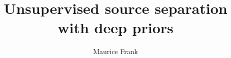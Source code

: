 \documentclass[nofonts, nobib, notitlepage, notoc, a4paper]{tufte-book}
\title{Unsupervised source separation with deep priors}
\author{Maurice Frank}
\begin{document}
\frontmatter%


\tableofcontents%
\clearpage

\mainmatter%








\backmatter%
\printbibliography%

\appendix%
\appendixpage%
\addappheadtotoc%

\end{document}
